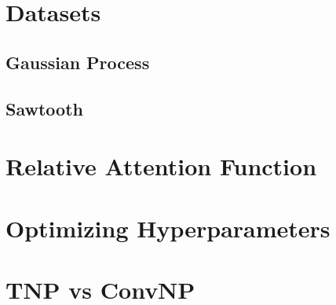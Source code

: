 \documentclass[../../main.tex]{subfiles}
\begin{document}
\section{Datasets}

\subsection{Gaussian Process}
\subsection{Sawtooth}

\section{Relative Attention Function}

\section{Optimizing Hyperparameters}

\section{TNP vs ConvNP}


\ifSubfilesClassLoaded{%
    \printbibliography{}
}{} 
\end{document}
